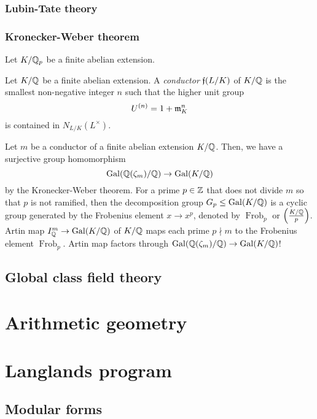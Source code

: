 \documentclass{../../large}
\DeclareMathOperator{\Frob}{Frob}
\begin{document}
\section{Lubin-Tate theory}
\section{Kronecker-Weber theorem}
\begin{prb}
Let $K/\mathbb{Q}_p$ be a finite abelian extension.

\end{prb}





Let $K/\mathbb{Q}$ be a finite abelian extension.
A \emph{conductor} $\mathfrak{f}(L/K)$ of $K/\mathbb{Q}$ is the smallest non-negative integer $n$ such that the higher unit group
\[U^{(n)}=1+\mathfrak{m}_K^n\]
is contained in $N_{L/K}(L^\times)$.

Let $m$ be a conductor of a finite abelian extension $K/\mathbb{Q}$.
Then, we have a surjective group homomorphism
\[\operatorname{Gal}(\mathbb{Q}(\zeta_m)/\mathbb{Q})\to\operatorname{Gal}(K/\mathbb{Q})\]
by the Kronecker-Weber theorem.
For a prime $p\in\mathbb{Z}$ that does not divide $m$ so that $p$ is not ramified, then the decomposition group $G_p\le\operatorname{Gal}(K/\mathbb{Q})$ is a cyclic group generated by the Frobenius element $x\to x^p$, denoted by $\Frob_p$ or $\left(\frac{K/\mathbb{Q}}p\right)$.
Artin map $I_{\mathbb{Q}}^m\to\operatorname{Gal}(K/\mathbb{Q})$ of $K/\mathbb{Q}$ maps each prime $p\nmid m$ to the Frobenius element $\Frob_p$.
Artin map factors through $\operatorname{Gal}(\mathbb{Q}(\zeta_m)/\mathbb{Q})\to\operatorname{Gal}(K/\mathbb{Q})$!


\chapter{Global class field theory}



\chapter{}




\part{Arithmetic geometry}

\part{Langlands program}
\chapter{Modular forms}
\end{document}
